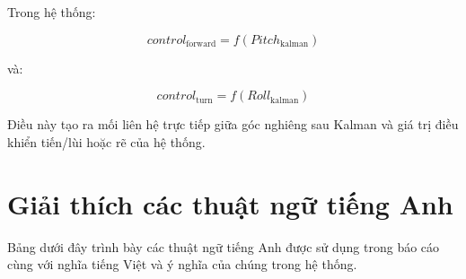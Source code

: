 \documentclass[a4paper,12pt]{report}
\begin{document}
Trong hệ thống:

\begin{equation}
control_{\text{forward}}
=
f(Pitch_{\text{kalman}})
\end{equation}

và:

\begin{equation}
control_{\text{turn}}
=
f(Roll_{\text{kalman}})
\end{equation}

Điều này tạo ra mối liên hệ trực tiếp giữa góc nghiêng sau Kalman và giá trị điều khiển tiến/lùi hoặc rẽ của hệ thống.


\section{Giải thích các thuật ngữ tiếng Anh}
\label{sec:terminology}

Bảng dưới đây trình bày các thuật ngữ tiếng Anh được sử dụng trong báo cáo cùng với nghĩa tiếng Việt và ý nghĩa của chúng trong hệ thống.
\end{document}
